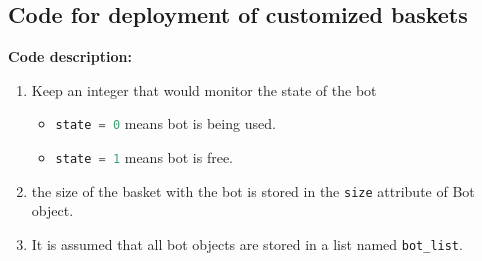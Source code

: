 \documentclass{article}
\begin{document}
\subsection{Code for deployment of customized baskets}
\label{code:k}
\textbf{Code description: }
\begin{enumerate}
\item Keep an integer that would monitor the state of the bot
\begin{itemize}
    \item \lstinline[language=Python]{state = 0} means bot is being used.
    \item \lstinline[language=Python]{state = 1} means bot is free.
\end{itemize}

\item the size of the basket with the bot is stored in the \lstinline[language=Python]{size} attribute of Bot object.
\item It is assumed that all bot objects are stored in a list named \lstinline[language=Python]{bot_list}.
\end{enumerate}
\end{document}
